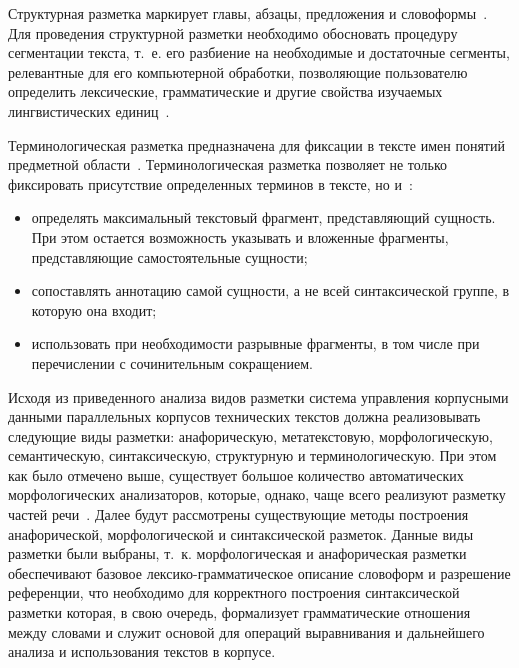 Структурная разметка маркирует главы, абзацы, предложения и словоформы~\cite{kibrik2019introduction}. Для проведения структурной разметки необходимо обосновать процедуру сегментации текста, т.~е. его разбиение на необходимые и достаточные сегменты, релевантные для его компьютерной обработки, позволяющие пользователю определить лексические, грамматические и другие свойства изучаемых лингвистических единиц~\cite{gorban2021structural}. 

Терминологическая разметка предназначена для фиксации в тексте имен понятий предметной области~\cite{zagorulko2013software}. Терминологическая разметка позволяет не только фиксировать присутствие определенных терминов в тексте, но и~\cite{zagorulko2012system}:
\begin{itemize}
	\item определять максимальный текстовый фрагмент, представляющий сущность. При этом остается возможность указывать и вложенные фрагменты, представляющие самостоятельные сущности;
	\item сопоставлять аннотацию самой сущности, а не всей синтаксической 	группе, в которую она входит;
	\item  использовать при необходимости разрывные фрагменты, в том числе при перечислении с сочинительным сокращением.
\end{itemize} 

Исходя из приведенного анализа видов разметки система управления корпусными данными параллельных корпусов технических текстов должна реализовывать следующие виды разметки: анафорическую, метатекстовую, морфологическую, семантическую, синтаксическую, структурную и терминологическую. При этом как было отмечено выше, существует большое количество автоматических морфологических анализаторов, которые, однако, чаще всего реализуют разметку частей речи~\cite{butenko2025modeli}. Далее будут рассмотрены существующие методы построения анафорической, морфологической и синтаксической разметок. Данные виды разметки были выбраны, т.~к. морфологическая и анафорическая разметки обеспечивают базовое лексико-грамматическое описание словоформ и разрешение референции, что необходимо для корректного построения синтаксической разметки которая, в свою очередь, формализует грамматические отношения между словами и служит основой для операций выравнивания и дальнейшего анализа и использования текстов в корпусе.



